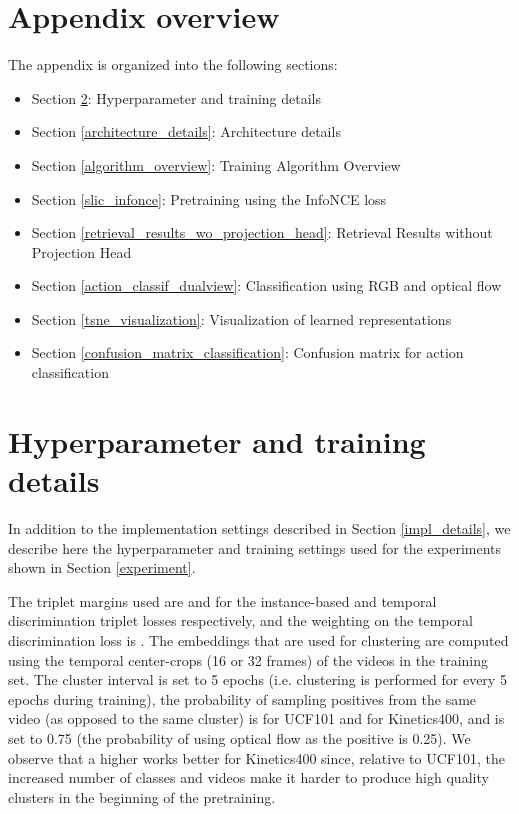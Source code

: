 \documentclass[10pt,twocolumn,letterpaper]{article}
\begin{document}
{\small




}

\clearpage


\appendix
\label{Appendix}

\section{Appendix overview}
The appendix is organized into the following sections:
\begin{itemize}
  \item Section \ref{appendix_impl_details}: Hyperparameter and training details
  \item Section \ref{architecture_details}: Architecture details
  \item Section \ref{algorithm_overview}: Training Algorithm Overview
  \item Section \ref{slic_infonce}: Pretraining using the InfoNCE loss
  \item Section \ref{retrieval_results_wo_projection_head}: Retrieval Results without Projection Head
  \item Section \ref{action_classif_dualview}: Classification using RGB and optical flow
  \item Section \ref{tsne_visualization}: Visualization of learned representations
  \item Section \ref{confusion_matrix_classification}: Confusion matrix for action classification
\end{itemize}

\section{Hyperparameter and training details}
\label{appendix_impl_details}
In addition to the implementation settings described in Section \ref{impl_details}, we describe here the hyperparameter and training settings used for the experiments shown in Section \ref{experiment}.

The triplet margins used are  and  for the instance-based and temporal discrimination triplet losses respectively, and the weighting on the temporal discrimination loss is . The embeddings that are used for clustering are computed using the temporal center-crops (16 or 32 frames) of the videos in the training set. The cluster interval  is set to 5 epochs (i.e. clustering is performed for every 5 epochs during training), the probability of sampling positives from the same video (as opposed to the same cluster) is  for UCF101 and  for Kinetics400, and  is set to 0.75 (the probability of using optical flow as the positive is 0.25). We observe that a higher  works better for Kinetics400 since, relative to UCF101, the increased number of classes and videos make it harder to produce high quality clusters in the beginning of the pretraining.
\end{document}
